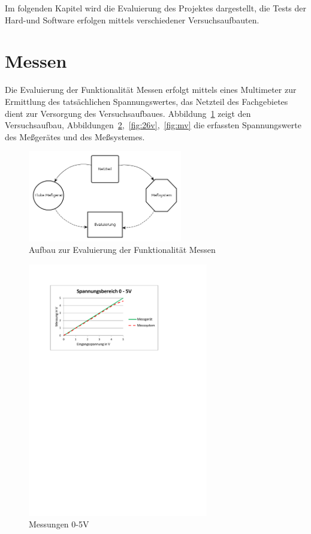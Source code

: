 \documentclass[
	11pt,								%
	a4paper,						%
	oneside,						%
	titlepage,					%
	headsepline,				%
	DIV13,							%
	abstracton,	 				%
	BCOR0cm,						%
	bibliography=totoc, %
]{scrreprt}							%
\begin{document}
\label{cha:Evaluierung}
Im folgenden Kapitel wird die Evaluierung des Projektes dargestellt, die Tests der Hard-und Software erfolgen mittels verschiedener Versuchsaufbauten. 
\section{Messen}
Die Evaluierung der Funktionalität Messen
erfolgt mittels eines Multimeter zur Ermittlung des tatsächlichen Spannungswertes, das Netzteil des Fachgebietes dient zur 
Versorgung des Versuchsaufbaues. Abbildung~\ref{fig:aufbau} zeigt den Versuchsaufbau, Abbildungen~\ref{fig:5v},~\ref{fig:26v},~\ref{fig:mv}  die erfassten Spannungswerte des Meßgerätes und des Meßsystemes.


\begin{figure}[htb]
\centering
\includegraphics[width=0.6\textwidth]{images/evalSpannung.png}
\caption{Aufbau zur Evaluierung der Funktionalität Messen}
\label{fig:aufbau}
\end{figure}

\begin{figure}[htb]
\centering
\includegraphics[width=0.7\textwidth]{images/5vpdf.pdf}
\caption{Messungen 0-5V}
\label{fig:5v}
\end{figure}
\end{document}
